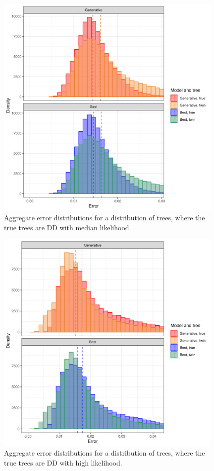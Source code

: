 \begin{figure}[H]
  \includegraphics[width=0.98\textwidth]{pirouette_example_23/errors_mid.png}
  \caption{Aggregate error distributions for a distribution of trees, 
    where the true trees are DD with median likelihood.}
\end{figure}

\begin{figure}[H]
  \includegraphics[width=0.98\textwidth]{pirouette_example_23/errors_high.png}
  \caption{
    Aggregate error distributions for a distribution of trees, 
    where the true trees are DD with high likelihood.
  }
\end{figure}

